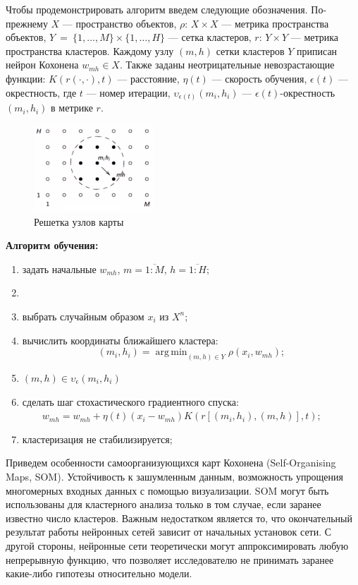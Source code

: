 \documentclass[article, 10pt]{disser}
\DeclareMathOperator*{\argmin}{arg\,min}
\begin{document}
Чтобы продемонстрировать алгоритм введем следующие обозначения. По-прежнему $X$ --- пространство объектов, $\rho:\,X \times X$ --- метрика пространства объектов, $Y~=~\{1,\dots,M\} \times \{1,\dots,H\}$ --- сетка кластеров, $r: \, Y \times Y$ --- метрика пространства кластеров. Каждому узлу  $(m,h)$ сетки кластеров $Y$ приписан нейрон Кохонена $w_{mh}\in X$. Также заданы неотрицательные невозрастающие функции: $K(r(\cdot,\cdot),t)$ --- расстояние, $\eta(t)$ --- скорость обучения, $\epsilon(t)$ --- окрестность, где $t$ --- номер итерации, $\upsilon_{\epsilon(t)}(m_i,h_i)$ --- $\epsilon(t)$-окрестность $(m_i,h_i)$ в метрике $r$.
	\begin{figure}[H]
	\begin{center}
	\includegraphics[width=0.4\textwidth]{karta.pdf}
	\caption{Решетка узлов карты}
	\end{center}
	\end{figure}
\noindent\textbf{Алгоритм обучения:}
	\begin{enumerate}
	\item задать начальные $w_{mh}$, $m=\overline{1:M}$, $h=\overline{1:H}$;
	\item {}
	\item\quad выбрать случайным образом $x_i$ из $X^n$;
	\item\quad вычислить координаты ближайшего кластера:
	$$(m_i,h_i)=\argmin_{(m,h)\in Y}\rho(x_i,w_{mh});$$
	\item{} $(m,h)\in\upsilon_{\epsilon}(m_i,h_i)$
	\item\qquad сделать шаг стохастического градиентного спуска:\\
	$\qquad w_{mh}=w_{mh}+\eta(t)(x_i-w_{mh})K\left(r[ (m_i,h_i),(m,h) ], t\right);$
	\item {} кластеризация не стабилизируется;
	\end{enumerate}
	
Приведем особенности самоорганизующихся карт Кохонена (Self-Organising Maps, SOM). Устойчивость к зашумленным данным, возможность упрощения многомерных входных данных с помощью визуализации. SOM могут быть использованы для кластерного анализа только в том случае, если заранее известно число кластеров. Важным недостатком является то, что окончательный результат работы нейронных сетей зависит от начальных установок сети. С другой стороны, нейронные сети теоретически могут аппроксимировать любую непрерывную функцию, что позволяет исследователю не принимать заранее какие-либо гипотезы относительно модели.
\end{document}
